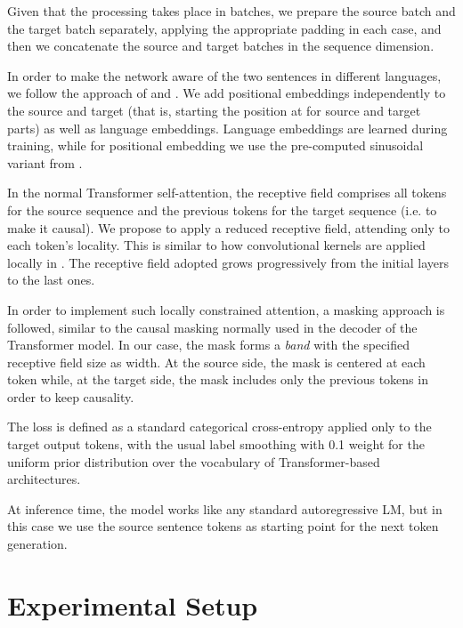 \documentclass[11pt,a4paper]{article}
\begin{document}
Given that the processing takes place in batches, we
prepare the source batch and the target batch separately,
applying the appropriate padding in each case,
and then we concatenate the source and target batches in
the sequence dimension.

In order to make the network aware of the two sentences in different languages, 
we follow the approach of \cite{he2018layerwise} and \cite{lample2019cross}.
We add positional embeddings independently to the source and target
(that is, starting the position at  for source and target parts)
as well as language embeddings. Language embeddings are learned 
during training, while for positional embedding we use the
pre-computed sinusoidal variant from \cite{vaswani2017transformer}.

In the normal Transformer self-attention, the receptive field
comprises all tokens for the source sequence and the previous
tokens for the target sequence (i.e. to make it causal).
We propose to apply a reduced receptive field, attending only
to each token's locality.
This is similar to how convolutional kernels are applied
locally in \cite{wu2018dynconv}. The receptive field adopted
grows progressively from the initial layers to the last ones.

In order to implement such locally constrained attention, a
masking approach is followed, similar to the causal masking
normally used in the decoder of the Transformer model. In our
case, the mask forms a \textit{band}
with the specified receptive field size as width. At the source
side, the mask is centered at each token while, at the target
side, the mask includes only the previous tokens in order
to keep causality.

The loss is defined as a standard categorical cross-entropy
applied only to the target output tokens, with the usual label 
smoothing with 0.1 weight for the uniform prior distribution over the vocabulary
of Transformer-based architectures.

At inference time, the model works like any standard autoregressive LM,
but in this case we use the source sentence tokens as starting
point for the next token generation.

\section{Experimental Setup} \label{sec:experiments}
\end{document}
